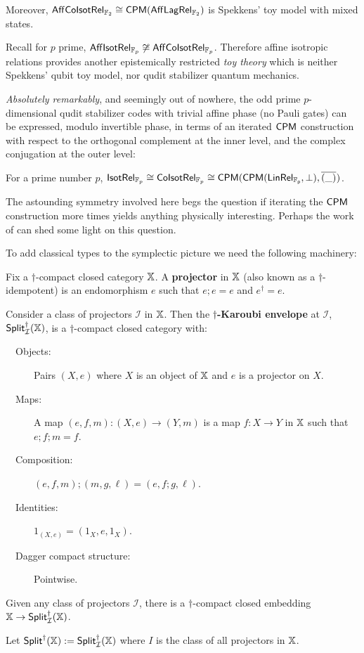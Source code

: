 \begin{corollary}
Moreover, $\mathsf{Aff}{\sf Co}{\sf Isot}\mathsf{Rel}_{\mathbb{F}_2}\cong \mathsf{CPM}(\mathsf{Aff}\mathsf{Lag}\mathsf{Rel}_{\mathbb{F}_2})$ is Spekkens' toy model with mixed states.
\end{corollary}

Recall for $p$ prime, $\mathsf{Aff}{\sf Isot}\mathsf{Rel}_{\mathbb{F}_p} \not \cong \mathsf{Aff}{\sf Co}{\sf Isot}\mathsf{Rel}_{\mathbb{F}_p}$. Therefore affine isotropic relations provides another epistemically restricted {\em toy theory} which is neither Spekkens' qubit toy model, nor qudit stabilizer quantum mechanics.

{\em Absolutely remarkably}, and seemingly out of nowhere, the odd prime $p$-dimensional qudit  stabilizer codes with trivial affine phase (no Pauli gates) can be expressed, modulo invertible phase, in terms of an iterated $\mathsf{CPM}$ construction with respect to the orthogonal complement at the inner level, and the complex conjugation at the outer level:
\begin{corollary}
For a prime number $p$, ${\sf Isot}\mathsf{Rel}_{\mathbb{F}_p}\cong{\sf Co}{\sf Isot}\mathsf{Rel}_{\mathbb{F}_p}\cong \mathsf{CPM}(\mathsf{CPM}(\sf LinRel_{\mathbb{F}_p},\perp),\overline{(\_)}\hspace*{.01cm})$.
\end{corollary}
The astounding symmetry involved here begs the question if iterating the $\mathsf{CPM}$ construction more times yields anything physically interesting. Perhaps the work of \cite{CPMho} can shed some light on this question. 


To add classical types to the symplectic picture we need the following machinery:

\begin{definition}{\cite{idempotent}}
Fix  a $\dag$-compact closed category $\mathbb{X}$.
A {\bf projector} in $\mathbb{X}$ (also known as a $\dag$-idempotent) is an endomorphism $e$ such that $e;e=e$ and $e^\dag=e$.


Consider a class of projectors $\mathcal I$ in $\mathbb{X}$.  Then the {\bf $\dag$-Karoubi envelope} at $\mathcal I$, ${\sf Split}_{\mathcal I}^{\dag}(\mathbb{X})$, is a $\dag$-compact closed category with:
\begin{description}
\item[\ \ Objects:] Pairs $(X,e)$ where $X$ is an object of $\mathbb{X}$ and $e$ is a projector on $X$.
\item[\ \ Maps:] A map $(e,f,m):(X,e)\to (Y,m)$ is a map $f:X\to Y$ in $\mathbb{X}$ such that $e;f;m=f$.
\item[\ \ Composition:] $(e,f,m);(m,g,\ell) = (e,f;g,\ell)$.
\item[\ \ Identities:] $1_{(X,e)}=(1_X,e,1_X)$.
\item[\ \ Dagger compact structure:] Pointwise.
\end{description}



Given any class of projectors $\mathcal I$, there is a $\dag$-compact closed embedding 
$\mathbb{X}\to{\sf Split}_{\mathcal I}^{\dag}(\mathbb{X})$.

Let ${\sf Split}^{\dag}(\mathbb{X}):={\sf Split}_{\mathcal I}^{\dag}(\mathbb{X})$ where $I$ is the class of all projectors in $\mathbb{X}$.
\end{definition}

